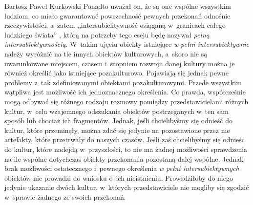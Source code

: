 \begin{artplenv}{Bartosz Paweł Kurkowski}
Ponadto uważał on, że są
one wspólne wszystkim ludziom, co miało gwarantować powszechność pewnych przekonań odnośnie rzeczywistości, a~zatem
,,intersubiektywność osiąganą w~granicach całego ludzkiego świata''
\parencite[s.~389]{zboron_podzial_2014},
którą na potrzeby tego eseju będę nazywał \textit{pełną intersubiektywnością}. W~takim ujęciu obiekty istniejące
\textit{w pełni intersubiektywnie} należy wyróżnić na tle innych obiektów kulturowych, a~skoro nie są uwarunkowane
miejscem, czasem i~stopniem rozwoju danej kultury można je również określić jako istniejące pozakulturowo. Pojawiają
się jednak pewne problemy z~tak zdefiniowanymi obiektami pozakulturowymi. Przede wszystkim wątpliwa jest możliwość ich
jednoznacznego określenia. Co prawda, współcześnie mogą odbywać się różnego rodzaju rozmowy pomiędzy przedstawicielami
różnych kultur, w~celu wzajemnego odszukania obiektów postrzeganych w~ten sam sposób lub chociaż ich fragmentów.
Jednak, jeśli chcielibyśmy się odnieść do kultur, które przeminęły, można zdać się jedynie na pozostawione przez nie
artefakty, które przetrwały do naszych czasów. Jeśli zaś chcielibyśmy się odnieść do kultur, które
nadejdą w~przyszłości, to nie ma żadnej możliwości sprawdzenia na ile wspólne dotychczas obiekty-przekonania pozostaną dalej
wspólne. Jednak brak możliwości ostatecznego i~pewnego określenia \textit{w pełni intersubiektywnych} obiektów nie
prowadzi do wniosku o~ich nieistnieniu. Prowadziłoby do niego jedynie ukazanie dwóch kultur, w~których przedstawiciele
nie mogliby się zgodzić w~sprawie żadnego ze swoich przekonań.



\end{artplenv}
